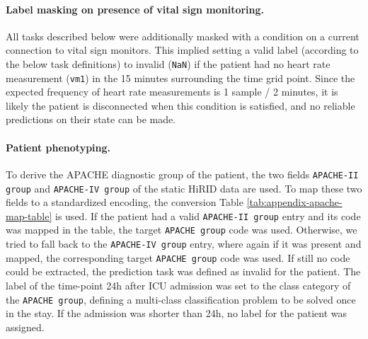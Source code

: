 \documentclass{article}
\begin{document}
\paragraph{Label masking on presence of vital sign monitoring. } All tasks described below were additionally masked with a condition on a current connection to vital sign monitors. This implied setting a valid label (according to the below task definitions) to invalid (\texttt{NaN}) if the patient had no heart rate measurement (\texttt{vm1}) in the 15 minutes surrounding the time grid point. Since the expected frequency of heart rate measurements is 1 sample / 2 minutes, it is likely the patient is disconnected when this condition is satisfied, and no reliable predictions on their state can be made.

\paragraph{Patient phenotyping.}
To derive the APACHE diagnostic group of the patient, the two fields \texttt{APACHE-II group} and \texttt{APACHE-IV group} of the static HiRID data are used. To map these two fields to a standardized encoding, the conversion Table \ref{tab:appendix-apache-map-table} is used. If the patient had a valid \texttt{APACHE-II group} entry and its code was mapped in the table, the target \texttt{APACHE group} code was used. Otherwise, we tried to fall back to the \texttt{APACHE-IV group} entry, where again if it was present and mapped, the corresponding target \texttt{APACHE group} code was used. If still no code could be extracted, the prediction task was defined as invalid for the patient. The label of the time-point 24h after ICU admission was set to the class category of the \texttt{APACHE group}, defining a multi-class classification problem to be solved once in the stay. If the admission was shorter than 24h, no label for the patient was assigned.
\end{document}
